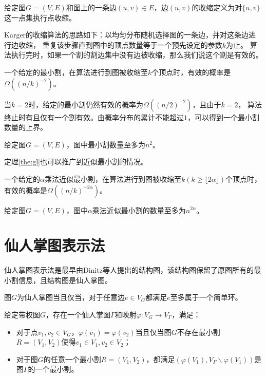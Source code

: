 \begin{definition}[边收缩]
    给定图$G=(V,E)$和图上的一条边$(u,v)\in E$，边$(u,v)$的收缩定义为对$\{u,v\}$这一点集执行点收缩。
\end{definition}

Karger的收缩算法的思路如下：以均匀分布随机选择图的一条边，并对这条边进行边收缩，
重复该步骤直到图中的顶点数量等于一个预先设定的参数$k$为止。
算法执行完时，如果一个割的割边集中没有边被收缩，那么我们说这个割是有效的。

\begin{theorem}\cite{karger1993global}
    \label{the:gl}
    一个给定的最小割，在算法进行到图被收缩至$k$个顶点时，有效的概率是$\Omega((n/k)^{-2})$。
\end{theorem}
当$k=2$时，给定的最小割仍然有效的概率为$\Omega((n/2)^{-2})$，且由于$k=2$，
算法终止时有且仅有一个割有效。由概率分布的累计不能超过$1$，可以得到一个最小割数量的上界。
\begin{theorem}
    给定图$G=(V,E)$，图中最小割数量至多为$n^2$。
\end{theorem}

定理\ref{the:gl}也可以推广到近似最小割的情况。
\begin{theorem}\cite{karger1993global}
    \label{the:agl}
    一个给定的$\alpha$乘法近似最小割，在算法进行到图被收缩至$k(k\geq \lfloor2\alpha\rfloor)$个顶点时，
    有效的概率是$\Omega((n/k)^{-2\alpha})$。
\end{theorem}

\begin{theorem}\cite{karger1994random}
    \label{the:approximatemincutnumber}
    给定图$G=(V,E)$，图中$\alpha$乘法近似最小割的数量至多为$n^{2\alpha}$。
\end{theorem}

\section{仙人掌图表示法}

仙人掌图表示法是最早由Dinitz等人提出的结构图，该结构图保留了原图所有的最小割信息，且结构图是仙人掌图。

\begin{definition}
    图$G$为仙人掌图当且仅当，对于任意边$e\in V_G$都满足$e$至多属于一个简单环。
\end{definition}

\begin{theorem}[仙人掌图表示法]\cite{dinitz1976structure}
\label{cactus}
    给定带权图$G$，存在一个仙人掌图$\Gamma$和映射$\varphi:V_G\rightarrow V_\Gamma$，满足：
    \begin{itemize}
        \item 对于点$v_1,v_2\in V_G$，$\varphi(v_1)=\varphi(v_2)$当且仅当图$G$不存在最小割$R=(V_1,V_2)$使得$v_1\in V_1,v_2\in V_2$；
        \item 对于图$G$的任意一个最小割$R=(V_1,V_2)$，都满足$(\varphi(V_1),V_\Gamma\backslash\varphi(V_1))$是图$\Gamma$的一个最小割。
    \end{itemize}
\end{theorem}





